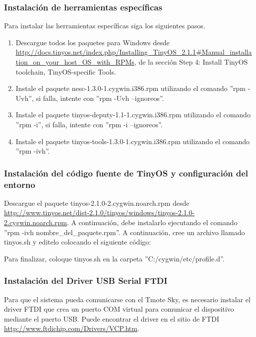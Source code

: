 \subsubsection{Instalación de herramientas específicas}
Para instalar las herramientas específicas siga los siguientes pasos.

\begin{enumerate}
\item Descargue todos los paquetes para Windows desde  \url{http://docs.tinyos.net/index.php/Installing_TinyOS_2.1.1#Manual_installation_on_your_host_OS_with_RPMs}, de la sección Step 4: Install TinyOS toolchain, TinyOS-specific Tools.

\item Instale el paquete nesc-1.3.0-1.cygwin.i386.rpm utilizando el comando ''rpm -Uvh'', si falla, intente con ''rpm -Uvh --ignoreos''.
\item Instale el paquete tinyos-deputy-1.1-1.cygwin.i386.rpm utilizando el comando ''rpm -i'', si falla, intente con ''rpm -i --ignoreos''.
\item Instale el paquete tinyos-tools-1.3.0-1.cygwin.i386.rpm utilizando el comando ''rpm -ivh''.
\end{enumerate}

\subsubsection{Instalación del código fuente de TinyOS y configuración del entorno}
Descargue el paquete tinyos-2.1.0-2.cygwin.noarch.rpm desde  \url{http://www.tinyos.net/dist-2.1.0/tinyos/windows/tinyos-2.1.0-2.cygwin.noarch.rpm}. A continuación, debe instalarlo ejecutando el comando ''rpm -ivh nombre\_del\_paquete.rpm''. A continuación, cree un archivo llamado tinyos.sh y editelo colocando el siguiente código:



Para finalizar, coloque tinyos.sh en la carpeta ''C:/cygwin/etc/profile.d''.

\subsubsection{Instalación del Driver USB Serial FTDI}
Para que el sistema pueda comunicarse con el Tmote Sky, es necesario instalar el driver FTDI que crea un puerto COM virtual para comunicar el dispositivo mediante el puerto USB. Puede encontrar el driver en el sitio de FTDI \url{http://www.ftdichip.com/Drivers/VCP.htm}.

